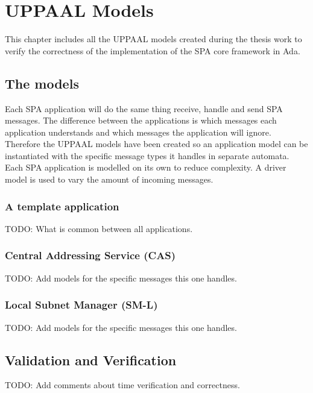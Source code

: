 \chapter{UPPAAL Models}\label{ch:uppaal_models}
This chapter includes all the UPPAAL models created during the thesis work to
verify the correctness of the implementation of the SPA core framework in Ada.

\section{The models}
Each SPA application will do the same thing receive, handle and send SPA
messages. The difference between the applications is which messages each
application understands and which messages the application will ignore.
Therefore the UPPAAL models have been created so an application model can be
instantiated with the specific message types it handles in separate automata.
Each SPA application is modelled on its own to reduce complexity. A driver
model is used to vary the amount of incoming messages.

\subsection{A template application}
TODO: What is common between all applications.

\subsection{Central Addressing Service (CAS)}
TODO: Add models for the specific messages this one handles.

\subsection{Local Subnet Manager (SM-L)}
TODO: Add models for the specific messages this one handles.

\section{Validation and Verification}
TODO: Add comments about time verification and correctness.
